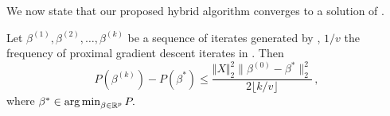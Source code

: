 We now state that our proposed hybrid algorithm converges to a solution of .

\begin{lemma}
  \label{lem:convergence}
  Let \(\beta^{(1)}, \beta^{(2)}, \dots, \beta^{(k)}\) be a sequence of
  iterates generated by , \(1/v\) the frequency of proximal gradient
  descent iterates in . Then
  \[
    P(\beta^{(k)}) - P(\beta^*) \leq \frac{\Vert X \Vert_2^2 \lVert \beta^{(0)} - \beta^* \rVert_2^2}{2\lfloor k/v \rfloor }\, ,
  \]
  where \(\beta^* \in \operatorname*{arg\,min}_{\beta \in \mathbb{R}^p} P.\)
\end{lemma}

